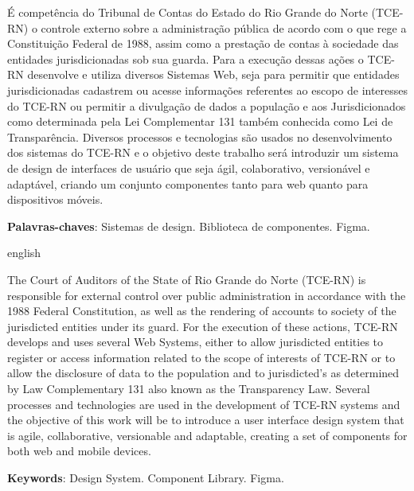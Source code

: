 \setlength{\absparsep}{18pt} %
\begin{resumo}

É competência do Tribunal de Contas do Estado do Rio Grande do Norte (TCE-RN) o controle externo sobre a administração pública de acordo com o que rege a Constituição Federal de 1988, assim como a prestação de contas à sociedade das entidades jurisdicionadas sob sua guarda. Para a execução dessas ações o TCE-RN desenvolve e utiliza diversos Sistemas Web, seja para permitir que entidades jurisdicionadas cadastrem ou acesse informações referentes ao escopo de interesses do TCE-RN ou permitir a divulgação de dados a população e aos Jurisdicionados como determinada pela Lei Complementar 131 também conhecida como Lei de Transparência. Diversos processos e tecnologias são usados no desenvolvimento dos sistemas do TCE-RN e o objetivo deste trabalho será introduzir um sistema de design de interfaces de usuário que seja ágil, colaborativo, versionável e adaptável, criando um conjunto componentes tanto para web quanto para dispositivos móveis.
 
 \noindent
 \textbf{Palavras-chaves}: Sistemas de design. Biblioteca de componentes. Figma. 
\end{resumo}
\begin{resumo}[Abstract]
	\begin{otherlanguage*}{english}
	
	The Court of Auditors of the State of Rio Grande do Norte (TCE-RN) is responsible for external control over public administration in accordance with the 1988 Federal Constitution, as well as the rendering of accounts to society of the jurisdicted entities under its guard. For the execution of these actions, TCE-RN develops and uses several Web Systems, either to allow jurisdicted entities to register or access information related to the scope of interests of TCE-RN or to allow the disclosure of data to the population and to jurisdicted's as determined by Law Complementary 131 also known as the Transparency Law. Several processes and technologies are used in the development of TCE-RN systems and the objective of this work will be to introduce a user interface design system that is agile, collaborative, versionable and adaptable, creating a set of components for both web and mobile devices. 
	
	\vspace{\onelineskip}
	\noindent 
	\textbf{Keywords}: Design System. Component Library. Figma.
	\end{otherlanguage*}
\end{resumo}